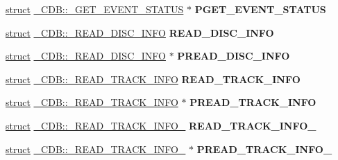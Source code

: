 \begin{DoxyCompactItemize}
\hyperlink{interfacestruct}{struct} \hyperlink{struct___c_d_b_1_1___g_e_t___e_v_e_n_t___s_t_a_t_u_s}{\+\_\+\+C\+D\+B\+::\+\_\+\+G\+E\+T\+\_\+\+E\+V\+E\+N\+T\+\_\+\+S\+T\+A\+T\+US} $\ast$ {\bfseries P\+G\+E\+T\+\_\+\+E\+V\+E\+N\+T\+\_\+\+S\+T\+A\+T\+US}
\item 
\mbox{\label{union___c_d_b_a5b9753211fc434ab7a96c77db8e674c0}} 
\hyperlink{interfacestruct}{struct} \hyperlink{struct___c_d_b_1_1___r_e_a_d___d_i_s_c___i_n_f_o}{\+\_\+\+C\+D\+B\+::\+\_\+\+R\+E\+A\+D\+\_\+\+D\+I\+S\+C\+\_\+\+I\+N\+FO} {\bfseries R\+E\+A\+D\+\_\+\+D\+I\+S\+C\+\_\+\+I\+N\+FO}
\item 
\mbox{\label{union___c_d_b_a3d22d4e96bcc73a35e8603d885357939}} 
\hyperlink{interfacestruct}{struct} \hyperlink{struct___c_d_b_1_1___r_e_a_d___d_i_s_c___i_n_f_o}{\+\_\+\+C\+D\+B\+::\+\_\+\+R\+E\+A\+D\+\_\+\+D\+I\+S\+C\+\_\+\+I\+N\+FO} $\ast$ {\bfseries P\+R\+E\+A\+D\+\_\+\+D\+I\+S\+C\+\_\+\+I\+N\+FO}
\item 
\mbox{\label{union___c_d_b_afe856009f6332d40451fcd9f8c75b239}} 
\hyperlink{interfacestruct}{struct} \hyperlink{struct___c_d_b_1_1___r_e_a_d___t_r_a_c_k___i_n_f_o}{\+\_\+\+C\+D\+B\+::\+\_\+\+R\+E\+A\+D\+\_\+\+T\+R\+A\+C\+K\+\_\+\+I\+N\+FO} {\bfseries R\+E\+A\+D\+\_\+\+T\+R\+A\+C\+K\+\_\+\+I\+N\+FO}
\item 
\mbox{\label{union___c_d_b_a783603d72e14a3cdf96d4ce8686314b9}} 
\hyperlink{interfacestruct}{struct} \hyperlink{struct___c_d_b_1_1___r_e_a_d___t_r_a_c_k___i_n_f_o}{\+\_\+\+C\+D\+B\+::\+\_\+\+R\+E\+A\+D\+\_\+\+T\+R\+A\+C\+K\+\_\+\+I\+N\+FO} $\ast$ {\bfseries P\+R\+E\+A\+D\+\_\+\+T\+R\+A\+C\+K\+\_\+\+I\+N\+FO}
\item 
\mbox{\label{union___c_d_b_acfac7dcc2cdcb10db123a3bafdc37955}} 
\hyperlink{interfacestruct}{struct} \hyperlink{struct___c_d_b_1_1___r_e_a_d___t_r_a_c_k___i_n_f_o__3}{\+\_\+\+C\+D\+B\+::\+\_\+\+R\+E\+A\+D\+\_\+\+T\+R\+A\+C\+K\+\_\+\+I\+N\+F\+O\+\_} {\bfseries R\+E\+A\+D\+\_\+\+T\+R\+A\+C\+K\+\_\+\+I\+N\+F\+O\+\_}
\item 
\mbox{\label{union___c_d_b_a1ff38c98b438424c412b1e97ee448a26}} 
\hyperlink{interfacestruct}{struct} \hyperlink{struct___c_d_b_1_1___r_e_a_d___t_r_a_c_k___i_n_f_o__3}{\+\_\+\+C\+D\+B\+::\+\_\+\+R\+E\+A\+D\+\_\+\+T\+R\+A\+C\+K\+\_\+\+I\+N\+F\+O\+\_} $\ast$ {\bfseries P\+R\+E\+A\+D\+\_\+\+T\+R\+A\+C\+K\+\_\+\+I\+N\+F\+O\+\_}

\end{DoxyCompactItemize}
